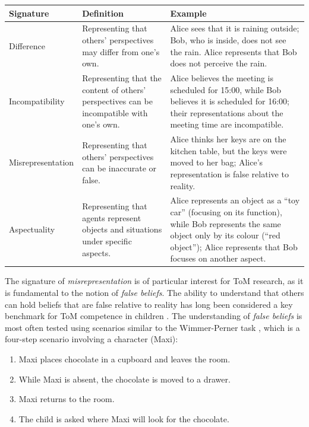 \begin{ctable}[!ht]
    \centering
    \begin{tabularx}{\textwidth}{l X X}
        \toprule
        \textbf{Signature} & \textbf{Definition} & \textbf{Example} \\
        \midrule
        Difference & Representing that others' perspectives may differ from one's own. & Alice sees that it is raining outside; Bob, who is inside, does not see the rain. Alice represents that Bob does not perceive the rain. \\
        Incompatibility & Representing that the content of others' perspectives can be incompatible with one's own. & Alice believes the meeting is scheduled for 15:00, while Bob believes it is scheduled for 16:00; their representations about the meeting time are incompatible. \\
        Misrepresentation & Representing that others' perspectives can be inaccurate or false. & Alice thinks her keys are on the kitchen table, but the keys were moved to her bag; Alice's representation is false relative to reality. \\
        Aspectuality & Representing that agents represent objects and situations under specific aspects. & Alice represents an object as a \enquote{toy car} (focusing on its function), while Bob represents the same object only by its colour (\enquote{red object}); Alice represents that Bob focuses on another aspect. \\
        \bottomrule
    \end{tabularx}
    \caption[Meta-representation signatures]{Four signatures of meta-representation adapted from \textcite{Rakoczy2022}, with illustrative examples.}
    \label{tab:tom-signatures}
\end{ctable}

The signature of \textit{misrepresentation} is of particular interest for \ac{ToM} research, as it is fundamental to the notion of \textit{false beliefs}. The ability to understand that others can hold beliefs that are false relative to reality has long been considered a key benchmark for \ac{ToM} competence in children \parencite{Wellman2001}. The understanding of \textit{false beliefs} is most often tested using scenarios similar to the Wimmer-Perner task \parencite{Wimmer1983}, which is a four-step scenario involving a character (Maxi):

\begin{enumerate}[noitemsep]
    \item Maxi places chocolate in a cupboard and leaves the room.
    \item While Maxi is absent, the chocolate is moved to a drawer.
    \item Maxi returns to the room.
    \item The child is asked where Maxi will look for the chocolate.
\end{enumerate}

